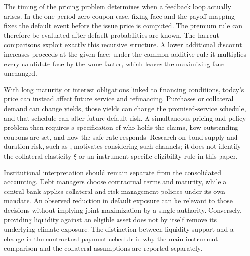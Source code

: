 The timing of the pricing problem determines when a feedback loop actually arises. In the one-period zero-coupon case, fixing face and the payoff mapping fixes the default event before the issue price is computed. The premium rule can therefore be evaluated after default probabilities are known. The haircut comparisons exploit exactly this recursive structure. A lower additional discount increases proceeds at the given face; under the common additive rule it multiplies every candidate face by the same factor, which leaves the maximizing face unchanged.

With long maturity or interest obligations linked to financing conditions, today's price can instead affect future service and refinancing. Purchases or collateral demand can change yields, those yields can change the promised-service schedule, and that schedule can alter future default risk. A simultaneous pricing and policy problem then requires a specification of who holds the claims, how outstanding coupons are set, and how the safe rate responds. Research on bond supply and duration risk, such as \textcite{GreenwoodVayanos2014}, motivates considering such channels; it does not identify the collateral elasticity $\xi$ or an instrument-specific eligibility rule in this paper.

Institutional interpretation should remain separate from the consolidated accounting. Debt managers choose contractual terms and maturity, while a central bank applies collateral and risk-management policies under its own mandate. An observed reduction in default exposure can be relevant to those decisions without implying joint maximization by a single authority. Conversely, providing liquidity against an eligible asset does not by itself remove its underlying climate exposure. The distinction between liquidity support and a change in the contractual payment schedule is why the main instrument comparison and the collateral assumptions are reported separately.
